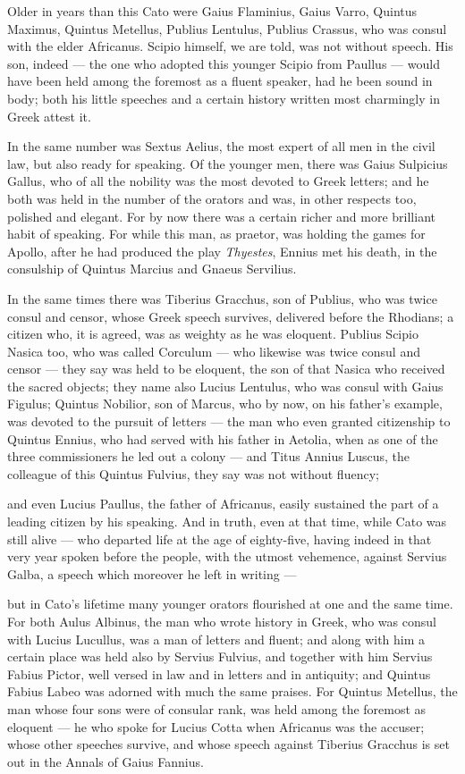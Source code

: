  Older in years than this Cato were Gaius Flaminius, Gaius Varro, Quintus Maximus, Quintus Metellus, Publius Lentulus, Publius Crassus, who was consul with the elder Africanus. Scipio himself, we are told, was not without speech. His son, indeed — the one who adopted this younger Scipio from Paullus — would have been held among the foremost as a fluent speaker, had he been sound in body; both his little speeches and a certain history written most charmingly in Greek attest it.

 In the same number was Sextus Aelius, the most expert of all men in the civil law, but also ready for speaking. Of the younger men, there was Gaius Sulpicius Gallus, who of all the nobility was the most devoted to Greek letters; and he both was held in the number of the orators and was, in other respects too, polished and elegant. For by now there was a certain richer and more brilliant habit of speaking. For while this man, as praetor, was holding the games for Apollo, after he had produced the play \textit{Thyestes}, Ennius met his death, in the consulship of Quintus Marcius and Gnaeus Servilius.

 In the same times there was Tiberius Gracchus, son of Publius, who was twice consul and censor, whose Greek speech survives, delivered before the Rhodians; a citizen who, it is agreed, was as weighty as he was eloquent. Publius Scipio Nasica too, who was called Corculum — who likewise was twice consul and censor — they say was held to be eloquent, the son of that Nasica who received the sacred objects; they name also Lucius Lentulus, who was consul with Gaius Figulus; Quintus Nobilior, son of Marcus, who by now, on his father's example, was devoted to the pursuit of letters — the man who even granted citizenship to Quintus Ennius, who had served with his father in Aetolia, when as one of the three commissioners he led out a colony — and Titus Annius Luscus, the colleague of this Quintus Fulvius, they say was not without fluency;

 and even Lucius Paullus, the father of Africanus, easily sustained the part of a leading citizen by his speaking. And in truth, even at that time, while Cato was still alive — who departed life at the age of eighty-five, having indeed in that very year spoken before the people, with the utmost vehemence, against Servius Galba, a speech which moreover he left in writing —

 but in Cato's lifetime many younger orators flourished at one and the same time. For both Aulus Albinus, the man who wrote history in Greek, who was consul with Lucius Lucullus, was a man of letters and fluent; and along with him a certain place was held also by Servius Fulvius, and together with him Servius Fabius Pictor, well versed in law and in letters and in antiquity; and Quintus Fabius Labeo was adorned with much the same praises. For Quintus Metellus, the man whose four sons were of consular rank, was held among the foremost as eloquent — he who spoke for Lucius Cotta when Africanus was the accuser; whose other speeches survive, and whose speech against Tiberius Gracchus is set out in the Annals of Gaius Fannius.

